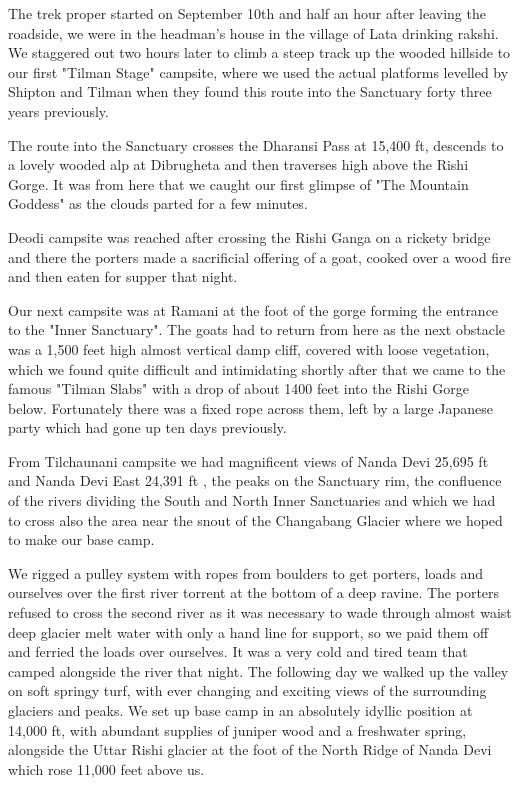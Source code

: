 \documentclass[a5paper,openany,font 10pt]{scrbook}
\begin{document}
The trek proper started on September 10th and half an hour
after leaving the roadside, we were in the headman's house in the
village of Lata drinking rakshi. We staggered out two hours later
to climb a steep track up the wooded hillside to our first
"Tilman Stage" campsite, where we used the actual platforms
levelled by Shipton and Tilman when they found this route into
the Sanctuary forty three years previously.

The route into the Sanctuary crosses the Dharansi Pass at
15,400 ft, descends to a lovely wooded alp at Dibrugheta and then
traverses high above the Rishi Gorge. It was from here that we
caught our first glimpse of "The Mountain Goddess" as the clouds
parted for a few minutes.

Deodi campsite was reached after crossing the Rishi Ganga on
a rickety bridge and there the porters made a sacrificial
offering of a goat, cooked over a wood fire and then eaten for
supper that night.

Our next campsite was at Ramani at the foot of the gorge
forming the entrance to the "Inner Sanctuary". The goats had to
return from here as the next obstacle was a 1,500 feet high
almost vertical damp cliff, covered with loose vegetation, which
we found quite difficult and intimidating  shortly after that we
came to the famous "Tilman Slabs" with a drop of about 1400 feet
into the Rishi Gorge below. Fortunately there was a fixed rope
across them, left by a large Japanese party which had gone up ten
days previously.

From Tilchaunani campsite we had magnificent views of Nanda
Devi  25,695 ft  and Nanda Devi East  24,391 ft , the peaks on
the Sanctuary rim, the confluence of the rivers dividing the
South and North Inner Sanctuaries and which we had to cross  also
the area near the snout of the Changabang Glacier where we hoped
to make our base camp.

We rigged a pulley system with ropes from boulders  to get
porters, loads and ourselves over the first river torrent at the
bottom of a deep ravine. The porters refused to cross the second
river as it was necessary to wade through almost waist deep
glacier melt water with only a hand line for support, so we paid
them off and ferried the loads over ourselves. It was a very cold
and tired team that camped alongside the river that night.
The following day we walked up the valley on soft springy
turf, with ever changing and exciting views of the surrounding
glaciers and peaks. We set up base camp in an absolutely idyllic
position at 14,000 ft, with abundant supplies of juniper wood and
a freshwater spring, alongside the Uttar Rishi glacier at the
foot of the North Ridge of Nanda Devi which rose 11,000 feet
above us.
\end{document}
